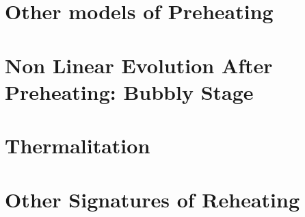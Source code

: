 \documentclass[11pt,a4paper,twoside]{book}
\begin{document}
\chapter{Other models of Preheating}

\chapter{Non Linear Evolution After Preheating: Bubbly Stage}

\chapter{Thermalitation}


\chapter{Other Signatures of Reheating}
\end{document}
